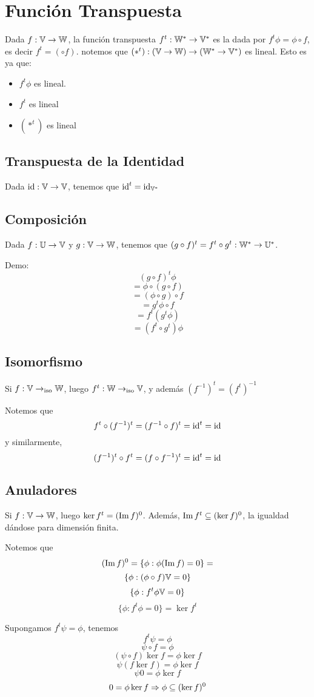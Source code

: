 \documentclass{article}
\begin{document}
\section*{Función Transpuesta}
Dada $f : \mathbb{V} \to \mathbb{W}$, la función transpuesta $f^t : \mathbb{W}^* \to \mathbb{V}^*$ es la dada
por $f^t \phi = \phi \circ f$, es decir $f^t = (\circ f)$. notemos que
$(*^t) : (\mathbb{V} \to \mathbb{W}) \to (\mathbb{W}^* \to \mathbb{V}^*)$ es lineal. Esto es ya que:
\begin{itemize}
	\item $f^t \phi$ es lineal.
	\item $f^t$ es lineal
	\item $(*^t)$ es lineal
\end{itemize}

\subsection*{Transpuesta de la Identidad}
Dada $\operatorname{id} : \mathbb{V} \to \mathbb{V}$, tenemos que $\operatorname{id}^t = \operatorname{id}_{\mathbb{V}^*}$

\subsection*{Composición}
Dada $f : \mathbb{U} \to \mathbb{V}$ y $g : \mathbb{V} \to \mathbb{W}$, tenemos que $(g \circ f)^t = f^t \circ
g^t : \mathbb{W}^* \to \mathbb{U}^*$.

Demo:
\[(g \circ f)^t \phi\]
\[= \phi \circ (g \circ f)\]
\[= (\phi \circ g) \circ f\]
\[= g^t \phi \circ f\]
\[= f^t (g^t \phi)\]
\[= (f^t \circ g^t) \phi\]

\subsection*{Isomorfismo}
Si $f : \mathbb{V} \to_{\operatorname{iso}} \mathbb{W}$, luego $f^t : \mathbb{W} \to_{\operatorname{iso}} \mathbb{V}$, y además $(f^{-1})^t
= (f^t)^{-1}$

Notemos que \[f^t \circ (f^{-1})^t = (f^{-1} \circ f)^t = \operatorname{id}^t = \operatorname{id}\]
y similarmente, \[(f^{-1})^t \circ f^t = (f \circ f^{-1})^t = \operatorname{id}^t = \operatorname{id}\]

\subsection*{Anuladores}
Si $f: \mathbb{V} \to \mathbb{W}$, luego $\ker f^t = (\operatorname{Im} f)^0$. Además, $\operatorname{Im} f^t \subseteq (\ker
f)^0$, la igualdad dándose para dimensión finita.

Notemos que
\[(\operatorname{Im} f)^0 = \{\phi : \phi (\operatorname{Im} f) = 0\} = \]
\[\{\phi : (\phi \circ f) \mathbb{V} = 0\}\]
\[\{\phi : f^t \phi \mathbb{V} = 0\}\]
\[\{\phi : f^t \phi = 0\} = \ker f^t\]

Supongamos $f^t \psi = \phi$, tenemos
\[f^t \psi = \phi\]
\[\psi \circ f = \phi\]
\[(\psi \circ f) \ker f = \phi \ker f\]
\[\psi (f \ker f) = \phi \ker f\]
\[\psi 0 = \phi \ker f\]
\[0 = \phi \ker f \Rightarrow \phi \subseteq (\ker f) ^0\]
\end{document}
